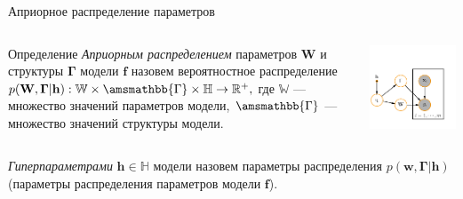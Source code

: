 \documentclass[usenames,dvipsnames,11pt,pdf,utf8,russian,aspectratio=43]{beamer}
\begin{document}
\begin{frame}{Априорное распределение параметров}
\footnotesize   
\begin{columns}
\begin{column}{0.6\textwidth}
   \begin{block}{Определение}
\textit{Априорным распределением} параметров $\mathbf{W}$ и структуры  $\boldsymbol{\Gamma}$ модели $\mathbf{f}$ назовем вероятностное распределение
$
    p(\mathbf{W}, \boldsymbol{\Gamma}|\mathbf{h}): \mathbb{W} \times \amsmathbb{\Gamma} \times \mathbb{H} \to \mathbb{R}^{+}, 
$
где $\mathbb{W}$ --- множество значений параметров модели, $\amsmathbb{\Gamma}$ --- множество значений структуры модели.
\end{block}

\end{column}
\begin{column}{0.4\textwidth}  %
    \begin{center}
     \includegraphics[width=\textwidth]{plate.pdf}
     \end{center}
\end{column}
\end{columns}
\vspace*{-0.5cm}
\begin{block}{}
\textit{Гиперпараметрами} $\mathbf{h}\in \mathbb{H}$ модели  назовем параметры распределения $p(\mathbf{w}, \boldsymbol{\Gamma}|\mathbf{h})$ (параметры распределения параметров модели $\mathbf{f}$).
\end{block}


\end{frame}
\end{document}
